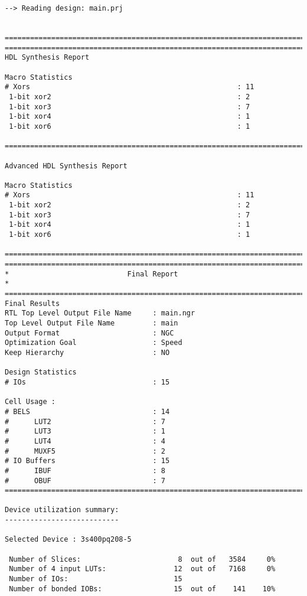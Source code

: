 \documentclass[14pt]{report}
\begin{document}
{\begin{verbatim}
--> Reading design: main.prj


=========================================================================
=========================================================================
HDL Synthesis Report

Macro Statistics
# Xors                                                 : 11
 1-bit xor2                                            : 2
 1-bit xor3                                            : 7
 1-bit xor4                                            : 1
 1-bit xor6                                            : 1

=========================================================================

Advanced HDL Synthesis Report

Macro Statistics
# Xors                                                 : 11
 1-bit xor2                                            : 2
 1-bit xor3                                            : 7
 1-bit xor4                                            : 1
 1-bit xor6                                            : 1

=========================================================================
=========================================================================
*                            Final Report                               *
=========================================================================
Final Results
RTL Top Level Output File Name     : main.ngr
Top Level Output File Name         : main
Output Format                      : NGC
Optimization Goal                  : Speed
Keep Hierarchy                     : NO

Design Statistics
# IOs                              : 15

Cell Usage :
# BELS                             : 14
#      LUT2                        : 7
#      LUT3                        : 1
#      LUT4                        : 4
#      MUXF5                       : 2
# IO Buffers                       : 15
#      IBUF                        : 8
#      OBUF                        : 7
=========================================================================

Device utilization summary:
---------------------------

Selected Device : 3s400pq208-5 

 Number of Slices:                       8  out of   3584     0%  
 Number of 4 input LUTs:                12  out of   7168     0%  
 Number of IOs:                         15
 Number of bonded IOBs:                 15  out of    141    10%  


\end{verbatim}}
\end{document}
